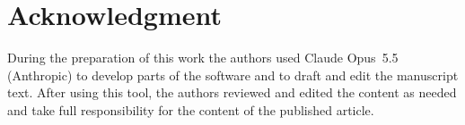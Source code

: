 \section*{Acknowledgment}

During the preparation of this work the authors used Claude Opus~5.5
(Anthropic) to
develop parts of the software and to draft and edit the manuscript
text. After using
this tool, the authors reviewed and edited the content as needed and take full
responsibility for the content of the published article.
